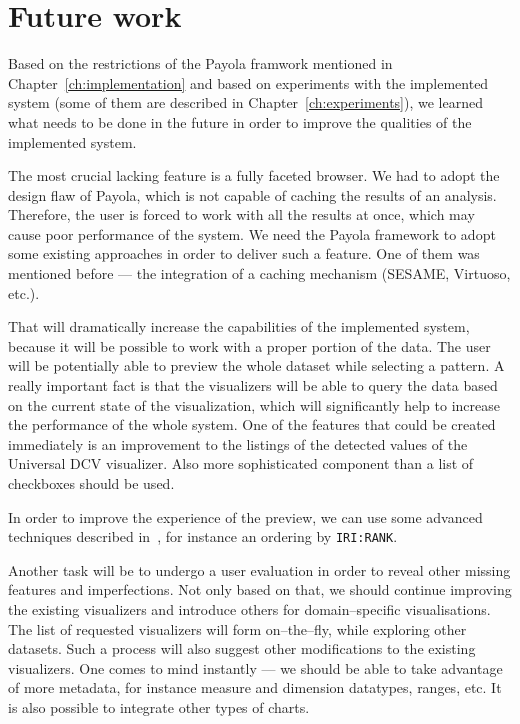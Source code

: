 \chapter{Future work}
\label{ch:future}

Based on the restrictions of the Payola framwork mentioned in Chapter~\ref{ch:implementation}
and based on experiments with the implemented system (some of them are described in
Chapter~\ref{ch:experiments}), we learned what needs to be done in the future in order to improve
the qualities of the implemented system.

The most crucial lacking feature is a fully faceted browser. We had to adopt the 
design flaw of Payola, which is not capable of caching the results of an analysis. 
Therefore, the user is forced to work with all the results at once, which may 
cause poor performance of the system. We need the Payola framework to adopt some 
existing approaches in order to deliver such a feature. One of them was 
mentioned before --- the integration of a caching mechanism (SESAME, Virtuoso, etc.).

That will dramatically increase the capabilities of the implemented system, 
because it will be possible to work with a proper portion of the data. The user will 
be potentially able to preview the whole dataset while selecting a pattern. A 
really important fact is that the visualizers will be able to query the data 
based on the current state of the visualization, which will significantly help 
to increase the performance of the whole system. One of the features that could 
be created immediately is an improvement to the listings of the detected values of the 
Universal DCV visualizer. Also more sophisticated component than a list of 
checkboxes should be used.

In order to improve the experience of the preview, we can use some advanced 
techniques described in~\cite{faceted-ldow2009}, for instance an ordering by 
\texttt{IRI:RANK}.

Another task will be to undergo a user evaluation in order to reveal other 
missing features and imperfections. Not only based on that, we should continue 
improving the existing visualizers and introduce others for
domain--specific visualisations. The list of requested visualizers will form 
on--the--fly, while exploring other datasets. Such a process will also suggest 
other modifications to the existing visualizers. One comes to mind instantly --- we 
should be able to take advantage of more metadata, for instance measure and 
dimension datatypes, ranges, etc. It is also possible to integrate other types 
of charts.

